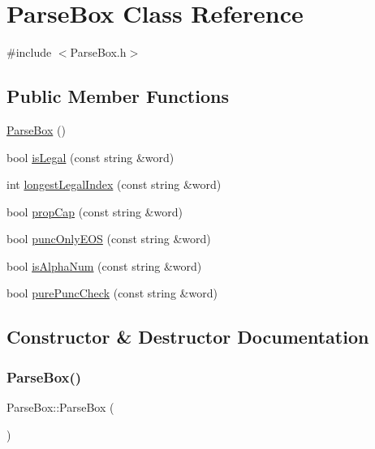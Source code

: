 \hypertarget{class_parse_box}{}\section{Parse\+Box Class Reference}
\label{class_parse_box}


{\ttfamily \#include $<$Parse\+Box.\+h$>$}

\subsection*{Public Member Functions}
\begin{DoxyCompactItemize}
\item 
\hyperlink{class_parse_box_a665d854a12d7cc0688aafedb7044b3da}{Parse\+Box} ()
\item 
bool \hyperlink{class_parse_box_ac70b7819c006993a9586586b8aaed3ef}{is\+Legal} (const string \&word)
\item 
int \hyperlink{class_parse_box_a31a51bf2e3ac4b3d080ed16715cb91f7}{longest\+Legal\+Index} (const string \&word)
\item 
bool \hyperlink{class_parse_box_a609f48172e85c1aab7ecfd8b85d1aeaf}{prop\+Cap} (const string \&word)
\item 
bool \hyperlink{class_parse_box_a1c28b6d19cabff28f54260d0b717062e}{punc\+Only\+E\+OS} (const string \&word)
\item 
bool \hyperlink{class_parse_box_a1c999341d7659ddd79cb0817fafbd912}{is\+Alpha\+Num} (const string \&word)
\item 
bool \hyperlink{class_parse_box_a8a507946e3db9f0d95baca471e6e7188}{pure\+Punc\+Check} (const string \&word)
\end{DoxyCompactItemize}


\subsection{Constructor \& Destructor Documentation}
\mbox{\label{class_parse_box_a665d854a12d7cc0688aafedb7044b3da}} 
\subsubsection{\texorpdfstring{Parse\+Box()}{ParseBox()}}
{\footnotesize\ttfamily Parse\+Box\+::\+Parse\+Box (\begin{DoxyParamCaption}{ }\end{DoxyParamCaption})}



